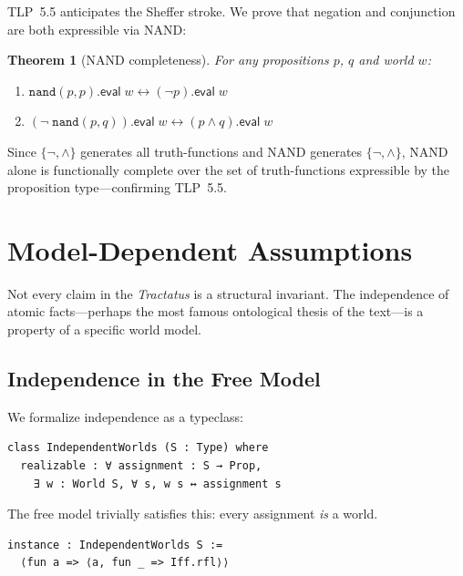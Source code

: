 \documentclass[10pt, letterpaper]{article}
\newtheorem{theorem}{Theorem}[section]
\theoremstyle{definition}
\theoremstyle{remark}
\newcommand{\eval}{\mathsf{eval}}
\begin{document}
TLP~5.5 anticipates the Sheffer stroke.  We prove that negation
and conjunction are both expressible via NAND:

\begin{theorem}[NAND completeness]
\label{thm:nand}
For any propositions $p$, $q$ and world $w$:
\begin{enumerate}[nosep]
  \item $\mathtt{nand}(p, p).\eval\;w \leftrightarrow
    (\lnot p).\eval\;w$
  \item $(\lnot\;\mathtt{nand}(p, q)).\eval\;w \leftrightarrow
    (p \land q).\eval\;w$
\end{enumerate}
\end{theorem}

\noindent
Since $\{\lnot, \land\}$ generates all truth-functions and NAND
generates $\{\lnot, \land\}$, NAND alone is functionally
complete over the set of truth-functions expressible by the
proposition type---confirming TLP~5.5.

\section{Model-Dependent Assumptions}
\label{sec:assumptions}

Not every claim in the \emph{Tractatus} is a structural
invariant.  The independence of atomic facts---perhaps the most
famous ontological thesis of the text---is a property of a
specific world model.

\subsection{Independence in the Free Model}
\label{sec:independence}

We formalize independence as a typeclass:

\begin{lstlisting}
class IndependentWorlds (S : Type) where
  realizable : ∀ assignment : S → Prop,
    ∃ w : World S, ∀ s, w s ↔ assignment s
\end{lstlisting}

\noindent
The free model trivially satisfies this: every assignment
\emph{is} a world.

\begin{lstlisting}
instance : IndependentWorlds S :=
  ⟨fun a => ⟨a, fun _ => Iff.rfl⟩⟩
\end{lstlisting}
\end{document}
